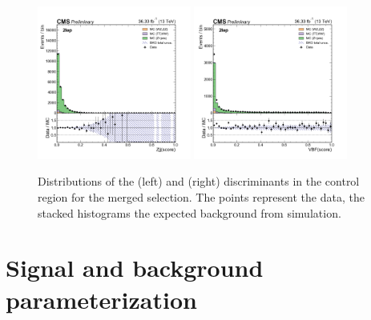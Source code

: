  \begin{figure}[htbp]
    \centering
    \includegraphics[width=0.45\textwidth]{figures/HighMassSearches/dataMCPlots/KD_ZJ_2lep.png}
    \includegraphics[width=0.45\textwidth]{figures/HighMassSearches/dataMCPlots/KD_JVBF_2lep.png}\\
    \caption{Distributions of the \ZJJMELA (left) and \VBFMELA (right) discriminants in the control region for the merged selection. The points represent the data, the stacked histograms the expected background from simulation.
    }
    \label{fig:ZZmela_untag}
 \end{figure}

 \section{Signal and background parameterization}
 \label{Section_parameterization}

